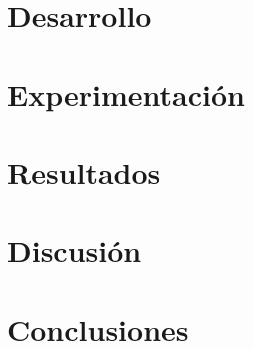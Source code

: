 \documentclass[10pt,a4paper]{article}
\begin{document}
\section{Desarrollo}

\newpage

\section{Experimentación}

\newpage

\section{Resultados}

\newpage


\section{Discusión}

\newpage

\section{Conclusiones}

\newpage
\end{document}
